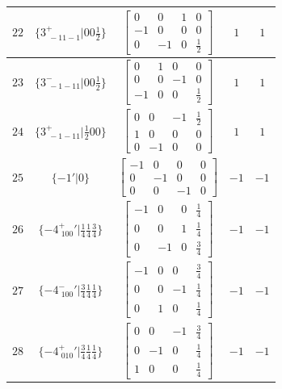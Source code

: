 \documentclass[fleqn,8pt]{jsarticle}
\begin{document}
\begin{longtable}{ccccc}
$ 22 $ & $ \{3^{+}_{\,\,-11-1}|0 0 \frac{1}{2}\} $ & $ \begin{bmatrix} 0 & 0 & 1 & 0 \\ -1 & 0 & 0 & 0 \\ 0 & -1 & 0 & \frac{1}{2} \end{bmatrix} $ & $ 1 $ & $ 1 $ \\ \hline
$ 23 $ & $ \{3^{-}_{\,\,-1-11}|0 0 \frac{1}{2}\} $ & $ \begin{bmatrix} 0 & 1 & 0 & 0 \\ 0 & 0 & -1 & 0 \\ -1 & 0 & 0 & \frac{1}{2} \end{bmatrix} $ & $ 1 $ & $ 1 $ \\ \hline
$ 24 $ & $ \{3^{+}_{\,\,-1-11}|\frac{1}{2} 0 0\} $ & $ \begin{bmatrix} 0 & 0 & -1 & \frac{1}{2} \\ 1 & 0 & 0 & 0 \\ 0 & -1 & 0 & 0 \end{bmatrix} $ & $ 1 $ & $ 1 $ \\ \hline
$ 25 $ & $ \{-1{}'|0\} $ & $ \begin{bmatrix} -1 & 0 & 0 & 0 \\ 0 & -1 & 0 & 0 \\ 0 & 0 & -1 & 0 \end{bmatrix} $ & $ -1 $ & $ -1 $ \\ \hline
$ 26 $ & $ \{-4^{+}_{\,\,100}{}'|\frac{1}{4} \frac{1}{4} \frac{3}{4}\} $ & $ \begin{bmatrix} -1 & 0 & 0 & \frac{1}{4} \\ 0 & 0 & 1 & \frac{1}{4} \\ 0 & -1 & 0 & \frac{3}{4} \end{bmatrix} $ & $ -1 $ & $ -1 $ \\ \hline
$ 27 $ & $ \{-4^{-}_{\,\,100}{}'|\frac{3}{4} \frac{1}{4} \frac{1}{4}\} $ & $ \begin{bmatrix} -1 & 0 & 0 & \frac{3}{4} \\ 0 & 0 & -1 & \frac{1}{4} \\ 0 & 1 & 0 & \frac{1}{4} \end{bmatrix} $ & $ -1 $ & $ -1 $ \\ \hline
$ 28 $ & $ \{-4^{+}_{\,\,010}{}'|\frac{3}{4} \frac{1}{4} \frac{1}{4}\} $ & $ \begin{bmatrix} 0 & 0 & -1 & \frac{3}{4} \\ 0 & -1 & 0 & \frac{1}{4} \\ 1 & 0 & 0 & \frac{1}{4} \end{bmatrix} $ & $ -1 $ & $ -1 $ \\ \hline

\end{longtable}
\end{document}
